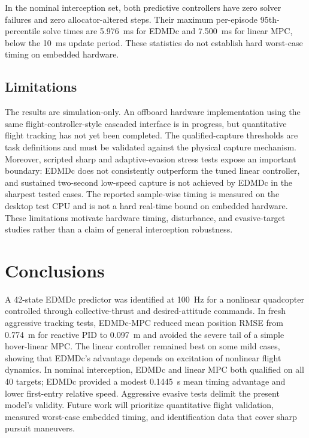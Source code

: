 \documentclass[letterpaper,10pt,conference]{ieeeconf}
\begin{document}
In the nominal interception set, both predictive controllers have zero solver
failures and zero allocator-altered steps. Their maximum per-episode
95th-percentile solve times are 5.976~ms for EDMDc and 7.500~ms for linear MPC,
below the 10~ms update period. These statistics do not establish hard
worst-case timing on embedded hardware.

\subsection{Limitations}

The results are simulation-only. An offboard hardware implementation using
the same flight-controller-style cascaded interface is in progress, but
quantitative flight tracking has not yet been completed. The qualified-capture thresholds are task
definitions and must be validated against the physical capture mechanism.
Moreover, scripted sharp and adaptive-evasion stress tests expose an important
boundary: EDMDc does not consistently outperform the tuned linear controller,
and sustained two-second low-speed capture is not achieved by EDMDc in the
sharpest tested cases. The reported sample-wise timing is measured on the
desktop test CPU and is not a hard real-time bound on embedded hardware.
These limitations motivate hardware timing, disturbance, and evasive-target
studies rather than a claim of general interception robustness.

\section{Conclusions}
\label{sec:conclusions}

A 42-state EDMDc predictor was identified at 100~Hz for a nonlinear
quadcopter controlled through collective-thrust and desired-attitude commands.
In fresh aggressive tracking tests, EDMDc-MPC reduced mean position RMSE from
0.774~m for reactive PID to 0.097~m and avoided the severe tail of a simple
hover-linear MPC. The linear controller remained best on some mild cases,
showing that EDMDc's advantage depends on excitation of nonlinear flight
dynamics. In nominal interception, EDMDc and linear MPC both qualified on all
40 targets; EDMDc provided a modest 0.1445~s mean timing advantage and lower
first-entry relative speed. Aggressive evasive tests delimit the present
model's validity. Future
work will prioritize quantitative flight validation, measured worst-case
embedded timing, and identification data that cover sharp pursuit maneuvers.



\end{document}
